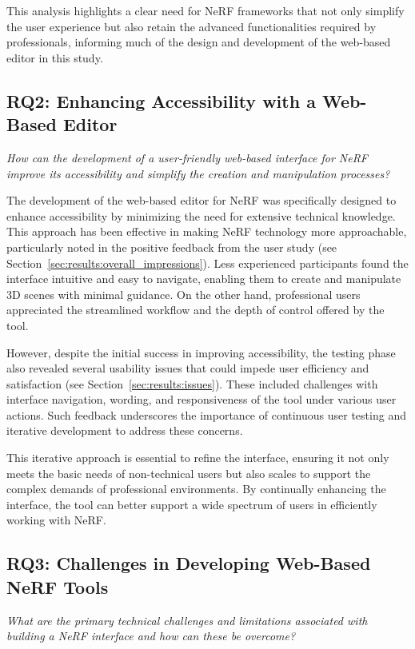 This analysis highlights a clear need for NeRF frameworks that not only simplify the user experience but also retain the advanced functionalities required by professionals, informing much of the design and development of the web-based editor in this study.

\subsection*{RQ2: Enhancing Accessibility with a Web-Based Editor}

\emph{How can the development of a user-friendly web-based interface for NeRF improve its accessibility and simplify the creation and manipulation processes?}

The development of the web-based editor for NeRF was specifically designed to enhance accessibility by minimizing the need for extensive technical knowledge.
This approach has been effective in making NeRF technology more approachable, particularly noted in the positive feedback from the user study (see Section~\ref{sec:results:overall_impressions}).
Less experienced participants found the interface intuitive and easy to navigate, enabling them to create and manipulate 3D scenes with minimal guidance.
On the other hand, professional users appreciated the streamlined workflow and the depth of control offered by the tool.

However, despite the initial success in improving accessibility, the testing phase also revealed several usability issues that could impede user efficiency and satisfaction (see Section~\ref{sec:results:issues}).
These included challenges with interface navigation, wording, and responsiveness of the tool under various user actions.
Such feedback underscores the importance of continuous user testing and iterative development to address these concerns.

This iterative approach is essential to refine the interface, ensuring it not only meets the basic needs of non-technical users but also scales to support the complex demands of professional environments.
By continually enhancing the interface, the tool can better support a wide spectrum of users in efficiently working with NeRF.

\subsection*{RQ3: Challenges in Developing Web-Based NeRF Tools}
\emph{What are the primary technical challenges and limitations associated with building a NeRF interface and how can these be overcome?}

